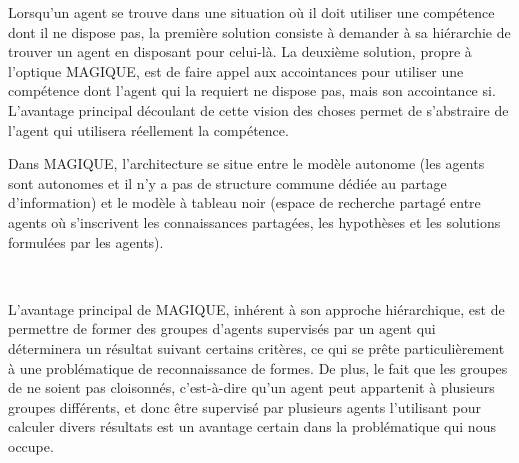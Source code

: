 Lorsqu'un agent se trouve dans une situation où il doit utiliser une compétence dont il ne dispose pas, la première solution consiste à demander à sa hiérarchie de trouver un agent en disposant pour celui-là. La deuxième solution, propre à l'optique MAGIQUE, est de faire appel aux accointances pour utiliser une compétence dont l'agent qui la requiert ne dispose pas, mais son accointance si. L'avantage principal découlant de cette vision des choses permet de s'abstraire de l'agent qui utilisera réellement la compétence.

Dans MAGIQUE, l'architecture se situe entre le modèle autonome (les agents sont autonomes et il n'y a pas de structure commune dédiée au partage d'information) et le modèle à tableau noir (espace de recherche partagé entre agents où s'inscrivent les connaissances partagées, les hypothèses et les solutions formulées par les agents).

~

L'avantage principal de MAGIQUE, inhérent à son approche hiérarchique, est de permettre de former des groupes d'agents supervisés par un agent qui déterminera un résultat suivant certains critères, ce qui se prête particulièrement à une problématique de reconnaissance de formes. De plus, le fait que les groupes de ne soient pas cloisonnés, c'est-à-dire qu'un agent peut appartenit à plusieurs groupes différents, et donc être supervisé par plusieurs agents l'utilisant pour calculer divers résultats est un avantage certain dans la problématique qui nous occupe.